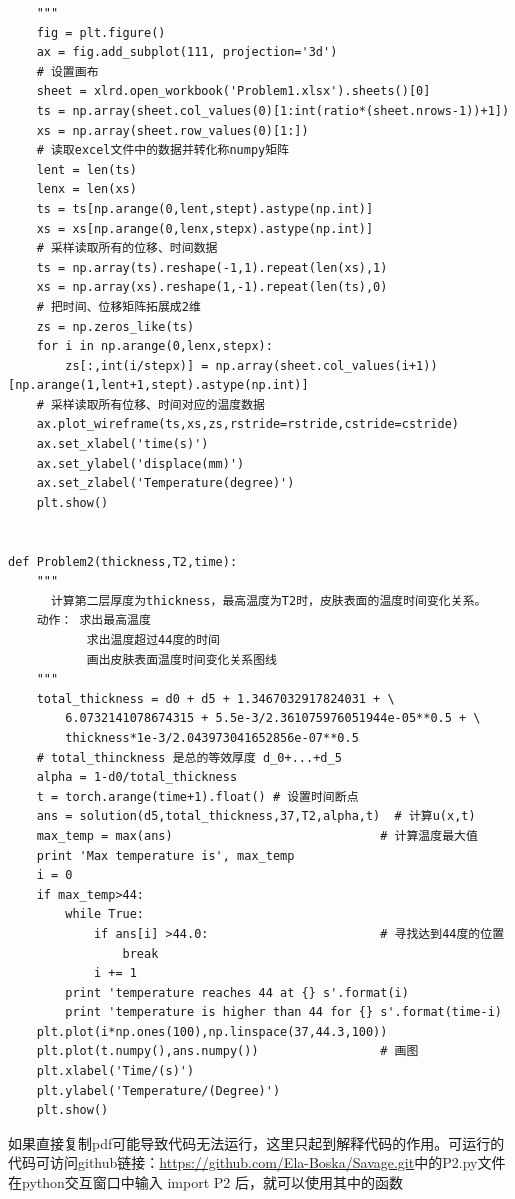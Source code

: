 \documentclass[bwprint]{cumcmthesis}
\begin{document}
\begin{verbatim}
    """
    fig = plt.figure()
    ax = fig.add_subplot(111, projection='3d')
    # 设置画布
    sheet = xlrd.open_workbook('Problem1.xlsx').sheets()[0]
    ts = np.array(sheet.col_values(0)[1:int(ratio*(sheet.nrows-1))+1])
    xs = np.array(sheet.row_values(0)[1:])
    # 读取excel文件中的数据并转化称numpy矩阵
    lent = len(ts)
    lenx = len(xs)
    ts = ts[np.arange(0,lent,stept).astype(np.int)]
    xs = xs[np.arange(0,lenx,stepx).astype(np.int)]
    # 采样读取所有的位移、时间数据
    ts = np.array(ts).reshape(-1,1).repeat(len(xs),1)
    xs = np.array(xs).reshape(1,-1).repeat(len(ts),0)
    # 把时间、位移矩阵拓展成2维
    zs = np.zeros_like(ts)
    for i in np.arange(0,lenx,stepx):
        zs[:,int(i/stepx)] = np.array(sheet.col_values(i+1))[np.arange(1,lent+1,stept).astype(np.int)]
    # 采样读取所有位移、时间对应的温度数据
    ax.plot_wireframe(ts,xs,zs,rstride=rstride,cstride=cstride)
    ax.set_xlabel('time(s)')
    ax.set_ylabel('displace(mm)')
    ax.set_zlabel('Temperature(degree)')
    plt.show()


def Problem2(thickness,T2,time):        
    """
      计算第二层厚度为thickness，最高温度为T2时，皮肤表面的温度时间变化关系。
    动作： 求出最高温度
           求出温度超过44度的时间
           画出皮肤表面温度时间变化关系图线
    """
    total_thickness = d0 + d5 + 1.3467032917824031 + \
        6.0732141078674315 + 5.5e-3/2.361075976051944e-05**0.5 + \
        thickness*1e-3/2.043973041652856e-07**0.5
    # total_thinckness 是总的等效厚度 d_0+...+d_5
    alpha = 1-d0/total_thickness
    t = torch.arange(time+1).float() # 设置时间断点
    ans = solution(d5,total_thickness,37,T2,alpha,t)  # 计算u(x,t)
    max_temp = max(ans)                             # 计算温度最大值
    print 'Max temperature is', max_temp            
    i = 0
    if max_temp>44:
        while True:
            if ans[i] >44.0:                        # 寻找达到44度的位置
                break
            i += 1
        print 'temperature reaches 44 at {} s'.format(i)
        print 'temperature is higher than 44 for {} s'.format(time-i)
    plt.plot(i*np.ones(100),np.linspace(37,44.3,100))
    plt.plot(t.numpy(),ans.numpy())                 # 画图
    plt.xlabel('Time/(s)')
    plt.ylabel('Temperature/(Degree)')
    plt.show()

\end{verbatim}
\indent 如果直接复制pdf可能导致代码无法运行，这里只起到解释代码的作用。可运行的代码可访问github链接：\href{https://github.com/Ela-Boska/Savage.git}{https://github.com/Ela-Boska/Savage.git}中的P2.py文件\\
在python交互窗口中输入 import P2 后，就可以使用其中的函数
\end{document}
